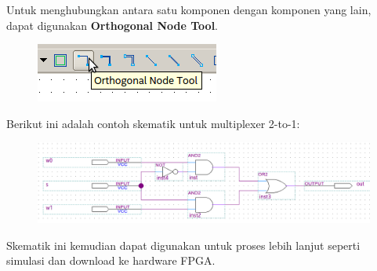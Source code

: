 Untuk menghubungkan antara satu komponen dengan komponen yang lain, dapat
digunakan \textbf{Orthogonal Node Tool}.
\begin{figure}[H]
\centering
\includegraphics[scale=0.5]{images/OrthogonalNodeTool.png}
\par
\end{figure}

Berikut ini adalah contoh skematik untuk multiplexer 2-to-1:
\begin{figure}[H]
\centering
\includegraphics[width=\textwidth]{images/sch_mux_2_1.png}
\par
\end{figure}

Skematik ini kemudian dapat digunakan untuk proses lebih lanjut seperti
simulasi dan download ke hardware FPGA.


